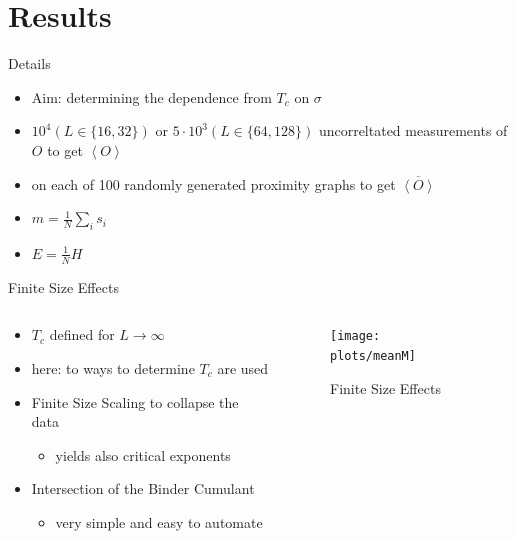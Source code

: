 \documentclass{beamer}
\newcommand{\avg}[1]{\left< #1 \right>}
\begin{document}
\section{Results}
    \begin{frame}{Details}
        \begin{itemize}[<+->]
            \item Aim: determining the dependence from \(T_{c}\) on \(\sigma\)
            \item \(10^{4} (L\in\{16,32\})\) or  \(5\cdot 10^{3} (L\in\{64,128\})\) uncorreltated measurements of \(O\) to get \(\avg{O}\)
            \item on each of 100 randomly generated proximity graphs to get \(\overline{\avg{O}}\){}
            \item \(m = \frac{1}{N} \sum_{i} s_{i}\)
            \item \(E = \frac{1}{N} H\)
        \end{itemize}
    \end{frame}

    \begin{frame}{Finite Size Effects}
        \begin{columns}[t]
            \begin{column}{5cm}
                \begin{itemize}[<+->]
                    \item \(T_{c}\) defined for \(L \to \infty\)
                    \item here: to ways to determine \(T_{c}\) are used
                    \item Finite Size Scaling to collapse the data
                    \begin{itemize}[<+->]
                        \item yields also critical exponents
                    \end{itemize}
                    \item Intersection of the Binder Cumulant
                    \begin{itemize}[<+->]
                        \item very simple and easy to automate
                    \end{itemize}
                \end{itemize}
            \end{column}
            \begin{column}{6cm}
                \begin{figure}[htbp]
                    \centering
                    \texttt{[image: plots/meanM]}
                    \caption
                    {
                        Finite Size Effects
                    }
                \end{figure}
            \end{column}
        \end{columns}
    \end{frame}
\end{document}
